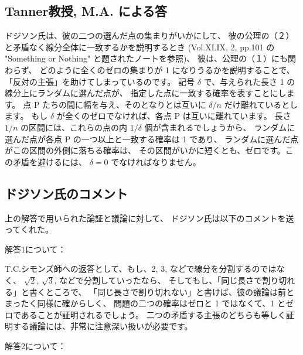 \documentclass{article}
\begin{document}
\subsection*{Tanner教授, M.A. による答}

 ドジソン氏は、彼の二つの選んだ点の集まりがいかにして、
彼の公理の（２）と矛盾なく線分全体に一致するかを説明するとき
(Vol.XLIX, 2, pp.101 の "Something or Nothing" と題されたノートを参照)、
彼は、公理の（１）にも関わらず、
どのように全くのゼロの集まりが 1 になりうるかを説明することで、
「反対の主張」を助けてしまっているのです。
 記号 $\delta$ で、与えられた長さ 1 の線分上にランダムに選んだ点が、
指定した点に一致する確率を表すことにします。
点 P たちの間に幅を与え、そのとなりとは互いに $\delta / n$
だけ離れているとします。
もし $\delta$ が全くのゼロでなければ、各点 P は互いに離れています。
長さ $1/n$ の区間には、これらの点の内 $1/\delta$ 個が含まれるでしょうから、
ランダムに選んだ点が各点 P の一つ以上と一致する確率は 1 であり、
ランダムに選んだ点がこの区間の外側に落ちる確率は、
その区間がいかに短くとも、ゼロです。この矛盾を避けるには、
$\delta = 0$ でなければなりません。

\subsection*{ドジソン氏のコメント}

上の解答で用いられた論証と議論に対して、
ドジソン氏は以下のコメントを送ってくれた。

解答1について：

T.C.シモンズ師への返答として、もし、2, 3, などで線分を分割するのではなく、
$\sqrt{2}$, $\sqrt{3}$, などで分割していったなら、
そしてもし、「同じ長さで割り切れる」と書くところで、
「同じ長さで割り切れない」と書けば、彼の議論は前とまったく同様に確からしく、
問題の二つの確率はゼロと 1 ではなくて、1 とゼロであることが証明されるでしょう。
二つの矛盾する主張のどちらも等しく証明する議論には、非常に注意深い扱いが必要です。

解答2について：
\end{document}
